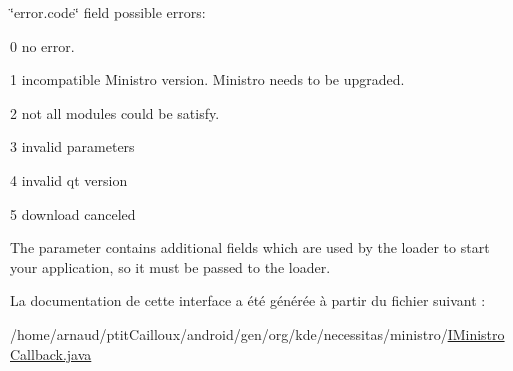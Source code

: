 \char`\"{}error.\-code\char`\"{} field possible errors\-:
\begin{DoxyItemize}
\item 0 no error.
\item 1 incompatible Ministro version. Ministro needs to be upgraded.
\item 2 not all modules could be satisfy.
\item 3 invalid parameters
\item 4 invalid qt version
\item 5 download canceled
\end{DoxyItemize}

The parameter contains additional fields which are used by the loader to start your application, so it must be passed to the loader. 

La documentation de cette interface a été générée à partir du fichier suivant \-:\begin{DoxyCompactItemize}
\item 
/home/arnaud/ptit\-Cailloux/android/gen/org/kde/necessitas/ministro/\hyperlink{_i_ministro_callback_8java}{I\-Ministro\-Callback.\-java}\end{DoxyCompactItemize}
